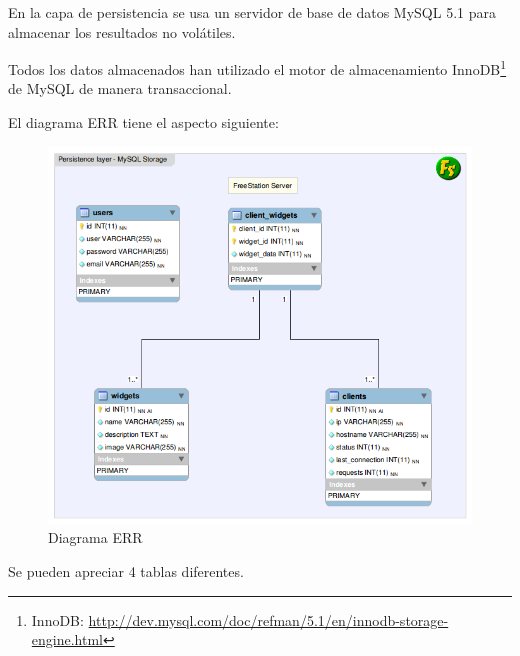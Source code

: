 En la capa de persistencia se usa un servidor de base de datos MySQL 5.1 para
almacenar los resultados no volátiles.

Todos los datos almacenados han utilizado el motor de almacenamiento
InnoDB\footnote{InnoDB:
\url{http://dev.mysql.com/doc/refman/5.1/en/innodb-storage-engine.html}} de
MySQL de manera transaccional.

El diagrama ERR tiene el aspecto siguiente:

\begin{figure}[ht]
    \begin{center}
        \includegraphics[scale=0.68]{src/img/diagrams/mysql-database.png}
        \caption[Diagrama ERR]
          {Diagrama ERR}
    \end{center}
\end{figure}

\newpage

Se pueden apreciar 4 tablas diferentes.

